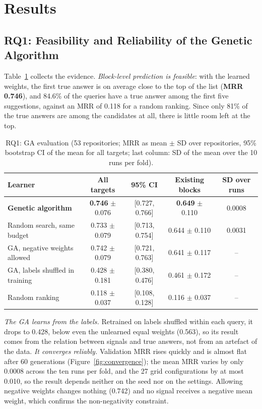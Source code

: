 \section{Results}
\label{sec:results}

\subsection{RQ1: Feasibility and Reliability of the Genetic Algorithm}
\label{sec:rq1}

Table~\ref{tab:rq1} collects the evidence. \emph{Block-level prediction is feasible}: with the
learned weights, the first true answer is on average close to the top of the list (\textbf{MRR 0.746}),
and 84.6\% of the queries have a true answer among the first five suggestions, against an MRR of
0.118 for a random ranking. Since only 81\% of the true answers are among the candidates at all,
there is little room left at the top.

\begin{table}[ht]
\setlength{\tabcolsep}{4pt}
\begin{tabular}{@{}lcccc@{}}
\toprule
Learner & All targets & 95\% CI & Existing blocks & SD over runs \\
\midrule
\textbf{Genetic algorithm}      & \textbf{0.746} $\pm$ 0.076 & [0.727, 0.766] & \textbf{0.649} $\pm$ 0.110 & 0.0008 \\
Random search, same budget      & 0.733 $\pm$ 0.079 & [0.713, 0.754] & 0.644 $\pm$ 0.110 & 0.0031 \\
GA, negative weights allowed    & 0.742 $\pm$ 0.079 & [0.721, 0.763] & 0.641 $\pm$ 0.117 & -- \\
GA, labels shuffled in training & 0.428 $\pm$ 0.181 & [0.380, 0.476] & 0.461 $\pm$ 0.172 & -- \\
Random ranking                  & 0.118 $\pm$ 0.037 & [0.108, 0.128] & 0.116 $\pm$ 0.037 & -- \\
\bottomrule
\end{tabular}
\centering
\small
\caption{RQ1: GA evaluation (53 repositories; MRR as mean $\pm$ SD over
repositories, 95\% bootstrap CI of the mean for all targets; last column: SD of the mean over the
10 runs per fold).}
\label{tab:rq1}
\end{table}

\emph{The GA learns from the labels.} Retrained on labels shuffled within each query, it drops to
0.428, below even the unlearned equal weights (0.563), so its result comes from the relation
between signals and true answers, not from an artefact of the data. \emph{It converges reliably.}
Validation MRR rises quickly and is almost flat after 60 generations
(Figure~\ref{fig:convergence}); the mean MRR varies by only 0.0008 across the ten runs per fold, and the 27 grid
configurations by at most 0.010, so the result depends neither on the seed nor on the settings.
Allowing negative weights changes nothing (0.742) and no signal receives a negative mean weight,
which confirms the non-negativity constraint.

